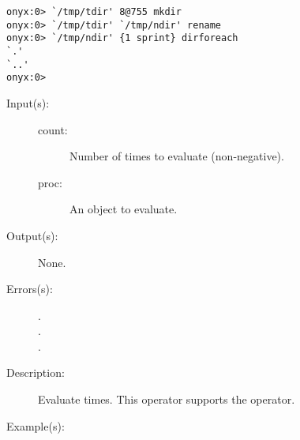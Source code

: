 \begin{description}
\begin{description}
\begin{verbatim}
onyx:0> `/tmp/tdir' 8@755 mkdir 
onyx:0> `/tmp/tdir' `/tmp/ndir' rename
onyx:0> `/tmp/ndir' {1 sprint} dirforeach
`.'
`..'
onyx:0>
		\end{verbatim}
	\end{description}
\label{systemdict:repeat}
\item[{\onyxop{count proc}{repeat}{--}}: ]
	\begin{description}\item[]
	\item[Input(s): ]
		\begin{description}\item[]
		\item[count: ]
			Number of times to evaluate  (non-negative).
		\item[proc: ]
			An object to evaluate.
		\end{description}
	\item[Output(s): ] None.
	\item[Errors(s): ]
		\begin{description}\item[]
		\item[.]
		\item[.]
		\item[.]
		\end{description}
	\item[Description: ]
		Evaluate   times.  This operator
		supports the 
		operator.
	\item[Example(s): ]\begin{verbatim}


\end{verbatim}
\end{description}
\end{description}
